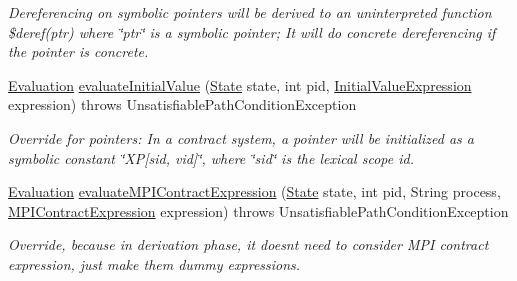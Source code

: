 \begin{DoxyCompactItemize}
\begin{DoxyCompactList}\small\item\em Dereferencing on symbolic pointers will be derived to an uninterpreted function {\ttfamily \$deref(ptr) where \char`\"{}ptr\char`\"{} is a symbolic pointer}; It will do concrete dereferencing if the pointer is concrete. \end{DoxyCompactList}\item 
\hyperlink{classedu_1_1udel_1_1cis_1_1vsl_1_1civl_1_1semantics_1_1IF_1_1Evaluation}{Evaluation} \hyperlink{classedu_1_1udel_1_1cis_1_1vsl_1_1civl_1_1semantics_1_1contract_1_1CommonContractConditionGenerator_af8245526311eae014bab1e2a3da19bf7}{evaluate\+Initial\+Value} (\hyperlink{interfaceedu_1_1udel_1_1cis_1_1vsl_1_1civl_1_1state_1_1IF_1_1State}{State} state, int pid, \hyperlink{interfaceedu_1_1udel_1_1cis_1_1vsl_1_1civl_1_1model_1_1IF_1_1expression_1_1InitialValueExpression}{Initial\+Value\+Expression} expression)  throws Unsatisfiable\+Path\+Condition\+Exception 
\begin{DoxyCompactList}\small\item\em Override for pointers\+: In a contract system, a pointer will be initialized as a symbolic constant \char`\"{}\+X\+P\mbox{[}sid, vid\mbox{]}\char`\"{}, where \char`\"{}sid\char`\"{} is the lexical scope id. \end{DoxyCompactList}\item 
\hypertarget{classedu_1_1udel_1_1cis_1_1vsl_1_1civl_1_1semantics_1_1contract_1_1CommonContractConditionGenerator_a36b1206280b39025118f108e5efe781a}{}\hyperlink{classedu_1_1udel_1_1cis_1_1vsl_1_1civl_1_1semantics_1_1IF_1_1Evaluation}{Evaluation} \hyperlink{classedu_1_1udel_1_1cis_1_1vsl_1_1civl_1_1semantics_1_1contract_1_1CommonContractConditionGenerator_a36b1206280b39025118f108e5efe781a}{evaluate\+M\+P\+I\+Contract\+Expression} (\hyperlink{interfaceedu_1_1udel_1_1cis_1_1vsl_1_1civl_1_1state_1_1IF_1_1State}{State} state, int pid, String process, \hyperlink{interfaceedu_1_1udel_1_1cis_1_1vsl_1_1civl_1_1model_1_1IF_1_1expression_1_1MPIContractExpression}{M\+P\+I\+Contract\+Expression} expression)  throws Unsatisfiable\+Path\+Condition\+Exception \label{classedu_1_1udel_1_1cis_1_1vsl_1_1civl_1_1semantics_1_1contract_1_1CommonContractConditionGenerator_a36b1206280b39025118f108e5efe781a}

\begin{DoxyCompactList}\small\item\em Override, because in derivation phase, it doesn\textquotesingle{}t need to consider M\+P\+I contract expression, just make them dummy expressions. \end{DoxyCompactList}\end{DoxyCompactItemize}
